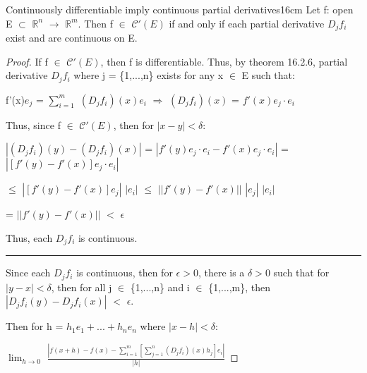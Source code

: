     \newpage



    \begin{wtheorem}{Continuously differentiable imply continuous
    partial derivatives}{16cm}
        Let f: open E $\subset$ $\mathbb{R}^n$ $\rightarrow$ $\mathbb{R}^m$.
        Then f $\in$ $\mathscr{C}'(E)$ if and only if
        each partial derivative $D_jf_i$ exist and are continuous on E.
    \end{wtheorem}

    \begin{proof}
        If f $\in$ $\mathscr{C}'(E)$, then f is differentiable.
        Thus, by {\color{red} theorem 16.2.6}, partial derivative $D_jf_i$
        where j = \{1,...,n\} exists for any x $\in$ E such that:

        \hspace{0.5cm}
        f'(x)$e_j$ = $\sum_{i=1}^m$ $(D_jf_i)(x)e_i$
        \hspace{1cm}
        $\Rightarrow$
        \hspace{1cm}
        $(D_jf_i)(x)$ = $f'(x)e_j \cdot e_i$

        Thus, since f $\in$ $\mathscr{C}'(E)$, then for $|x-y| < \delta$:

        \hspace{0.5cm}
        $|(D_jf_i)(y) - (D_jf_i)(x)|$
        = $|f'(y)e_j \cdot e_i - f'(x)e_j \cdot e_i|$
        = $|[f'(y) - f'(x)]e_j \cdot e_i|$

        \hspace{4.75cm}
        $\leq$ $|[f'(y) - f'(x)]e_j|$ $|e_i|$
        $\leq$ $||f'(y) - f'(x)||$ $|e_j|$ $|e_i|$

        \hspace{4.75cm}
        = $||f'(y) - f'(x)||$ $<$ $\epsilon$

        Thus, each $D_jf_i$ is continuous.

        \rule[0.1cm]{15.3cm}{0.01cm}

        Since each $D_jf_i$ is continuous, then for $\epsilon > 0$,
        there is a $\delta > 0$ such that for $|y-x| < \delta$, then
        for all j $\in$ \{1,...,n\} and i $\in$ \{1,...,m\}, then
        $|D_jf_i(y) - D_jf_i(x)|$ $<$ $\epsilon$.

        Then for h = $h_1e_1 + ... + h_ne_n$ where $|x-h| < \delta$:

        \hspace{0.5cm}
        $\lim_{h \rightarrow 0}$
        $\frac{|f(x+h) - f(x)
                - \sum_{i=1}^m [\sum_{j=1}^n (D_jf_i)(x)h_j]e_i|}{|h|}$


\end{proof}
